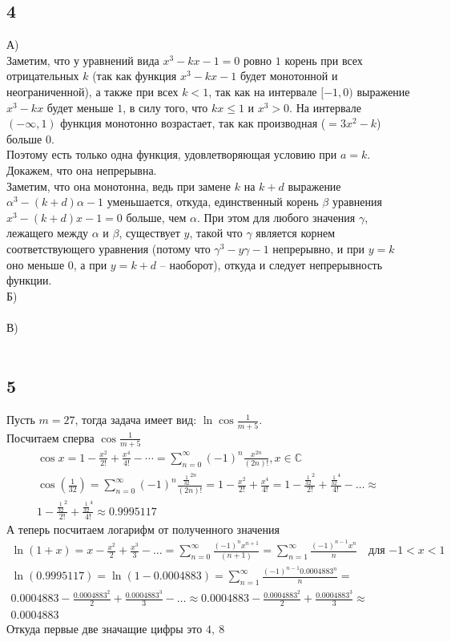 		\subsection{4}
		А)\\
		Заметим, что у уравнений вида $x^3 - kx - 1 = 0$ ровно $1$ корень при всех отрицательных $k$ (так как функция $x^3 - kx - 1$ будет монотонной и неограниченной), а также при всех $k < 1$, так как на интервале $[-1, 0)$ выражение $x^3 - kx$ будет меньше $1$, в силу того, что $kx \leqslant 1$ и $x^3 > 0$. На интервале $(-\infty, 1)$ функция монотонно возрастает, так как производная ($= 3x^2 - k$) больше $0$.\\
		Поэтому есть только одна функция, удовлетворяющая условию при $a = k$. Докажем, что она непрерывна.\\
		Заметим, что она монотонна, ведь при замене $k$ на $k+d$ выражение $\alpha^3 - (k+d)\alpha - 1$ уменьшается, откуда, единственный корень $\beta$ уравнения $x^3 - (k+d)x - 1 = 0$ больше, чем $\alpha$. При этом для любого значения $\gamma$, лежащего между $\alpha$ и $\beta$, существует $y$, такой что $\gamma$ является корнем соответствующего уравнения (потому что $\gamma^3 - y\gamma - 1$ непрерывно, и при $y = k$ оно меньше $0$, а при $y = k+d$ -- наоборот), откуда и следует непрерывность функции.
		\\
		Б)\\
		\\
		В)\\
		\\
		
		\subsection{5}
		Пусть $m = 27$, тогда задача имеет вид: $\ln\cos \frac{1}{m + 5}$.\\
		Посчитаем сперва $\cos \frac{1}{m + 5}$
		\begin{gather*}
			\cos x =  1 - \frac{x^2}{2!} + \frac{x^4}{4!} - \cdots = \sum_{n=0}^{\infty} {(-1)^n}\frac{x^{2n}}{(2n)!}, x\in\mathbb{C}\\
			\cos(\frac{1}{32}) = \sum_{n=0}^{\infty} {(-1)^n}\frac{\frac{1}{32}^{2n}}{(2n)!} = 1 - \frac{x^2}{2!} + \frac{x^4}{4!} =
			1 - \frac{\frac{1}{32}^2}{2!} + \frac{\frac{1}{32}^4}{4!} - \ldots \approx \\
			1 - \frac{\frac{1}{32}^2}{2!} + \frac{\frac{1}{32}^4}{4!} \approx 0.9995117
		\end{gather*}
		А теперь посчитаем логарифм от полученного значения
		\begin{gather*}
			\ln(1+x) = x - \frac{x^2}{2} + \frac{x^3}{3} - \ldots = \sum\limits^{\infty}_{n=0} \frac{(-1)^n x^{n+1}}{(n+1)} =  \sum\limits^{\infty}_{n=1} \frac{(- 1)^{n-1}x^n}{n} \quad \text{для $-1 < x < 1$}\\
			\ln(0.9995117) = \ln(1 - 0.0004883) = \sum\limits^{\infty}_{n=1} \frac{(- 1)^{n-1} 0.0004883^n}{n} = \\
			0.0004883 - \frac{0.0004883^2}{2} + \frac{0.0004883^3}{3} - \ldots \approx 0.0004883 - \frac{0.0004883^2}{2} + \frac{0.0004883^3}{3} \approx \\
			0.0004883
		\end{gather*}
		Откуда первые две значащие цифры это $4,\ 8$
		
